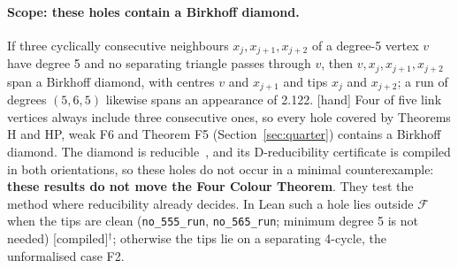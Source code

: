 \documentclass[11pt]{article}
\newcommand{\lab}[1]{\textsf{[#1]}}
\begin{document}
\paragraph{Scope: these holes contain a Birkhoff diamond.} If three cyclically consecutive neighbours $x_j,x_{j+1},x_{j+2}$ of a degree-5 vertex $v$ have degree 5 and no separating triangle passes through $v$, then $v,x_j,x_{j+1},x_{j+2}$ span a Birkhoff diamond, with centres $v$ and $x_{j+1}$ and tips $x_j$ and $x_{j+2}$; a run of degrees $(5,6,5)$ likewise spans an appearance of 2.122. \lab{hand} Four of five link vertices always include three consecutive ones, so every hole covered by Theorems H and HP, weak F6 and Theorem F5 (Section~\ref{sec:quarter}) contains a Birkhoff diamond. The diamond is reducible~\cite{birkhoff1913}, and its D-reducibility certificate is compiled in both orientations, so these holes do not occur in a minimal counterexample: \textbf{these results do not move the Four Colour Theorem}. They test the method where reducibility already decides. In Lean such a hole lies outside $\mathcal F$ when the tips are clean (\texttt{no\_555\_run}, \texttt{no\_565\_run}; minimum degree 5 is not needed) \lab{compiled}$^\dagger$; otherwise the tips lie on a separating 4-cycle, the unformalised case F2.
\end{document}
